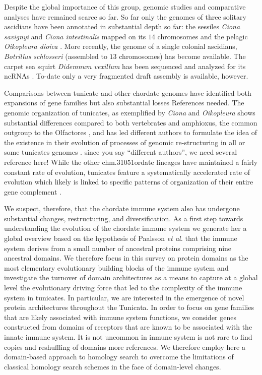 \documentclass[11pt]{article}
\newcommand{\TODO}[1]{\begingroup\color{red}#1\endgroup}
\begin{document}
Despite the global importance of this group, genomic studies and
comparative analyses have remained scarce so far. So far only the genomes
of three solitary ascidians have been annotated in substantial depth so
far: the sessiles \textit{Ciona savignyi} and \textit{Ciona intestinalis}
mapped on its $14$ chromosomes \cite{dehal2002draft, small2007haplome} and
the pelagic \textit{Oikopleura dioica}
\cite{denoeud2010plasticity,seo2001miniature}. More recently, the genome of
a single colonial ascidians, \textit{Botrillus schlosseri} (assembled to
$13$ chromosomes) \cite{voskoboynik2013genome} has become available.
The carpet sea squirt \textit{Didemnum vexillum} has been sequenced and
analyzed for its ncRNAs \cite{velandia2016a}. To-date only a very
fragmented draft assembly is available, however.

Comparisons between tunicate and other chordate genomes have identified
both expansions of gene families but also substantial losses
\TODO{References needed}. The genomic organization of tunicates, as
exemplified by \textit{Ciona} and \textit{Oikopleura} shows substantial
differences compared to both vertebrates and amphioxus, the common outgroup
to the Olfactores \cite{delsuc2006}, and has led different authors to
formulate the idea of the existence in their evolution of processes of
genomic re-structuring in all or some tunicates genomes
\cite{putnam2008amphioxus}.  \TODO{since you say ``different authors'', we
  need several reference here!}  While the other chm.31051ordate lineages have
maintained a fairly constant rate of evolution, tunicates feature a
systematically accelerated rate of evolution which likely is linked to
specific patterns of organization of their entire gene complement
\cite{putnam2008amphioxus, berna2014evolutionary}.

We suspect, therefore, that the chordate immune system also has undergone
substantial changes, restructuring, and diversification. As a first step
towards understanding the evolution of the chordate immune system we
generate her a global overview based on the hypothesis of Paalsson \emph{et
  al.} \cite{paalsson2007building} that the immune system derives from a
small number of ancestral proteins comprising nine ancestral domains.  We
therefore focus in this survey on protein domains as the most elementary
evolutionary building blocks of the immune system and investigate the
turnover of domain architectures as a means to capture at a global level
the evolutionary driving force that led to the complexity of the immune
system in tunicates. In particular, we are interested in the emergence of
novel protein architectures throughout the Tunicata. In order to focus on
gene families that are likely associated with immune system functions, we
consider genes constructed from domains of receptors that are known to be
associated with the innate immune system. It is not uncommon in inmune
system is not rare to find copies and reshuffling of domains
\cite{Forslund2012} \TODO{more references}. We therefore employ here a
domain-based approach to homology search to overcome the limitations of
classical homology search schemes in the face of domain-level changes.
\end{document}
